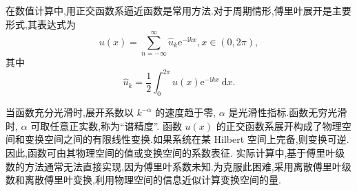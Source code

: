 


在数值计算中,用正交函数系逼近函数是常用方法.对于周期情形,傅里叶展开是主要形式,其表达式为
\begin{equation}
u(x)=\sum_{n=-\infty}^{\infty} \hat{u}_k \mathrm{e}^{-\mathrm{i} k x}, x \in(0,2 \pi),
\end{equation}
其中
\begin{equation}
\widehat{u}_k=\frac{1}{2} \int_0^{2 \pi} u(x) \mathrm{e}^{-\mathrm{i} k x} \mathrm{~d} x.
\end{equation}

当函数充分光滑时,展开系数以 $k^{-\alpha}$ 的速度趋于零, $\alpha$ 是光滑性指标.函数无穷光滑时, $\alpha$ 可取任意正实数,称为“谱精度”.
函数 $u(x)$ 的正交函数系展开构成了物理空间和变换空间之间的有限线性变换.如果系统在某 Hilbert 空间上完备,则变换可逆.因此,函数可由其物理空间的值或变换空间的系数表征.
实际计算中,基于傅里叶级数的方法通常无法直接实现,因为傅里叶系数未知.为克服此困难,采用离散傅里叶级数和离散傅里叶变换,利用物理空间的信息近似计算变换空间的量.

